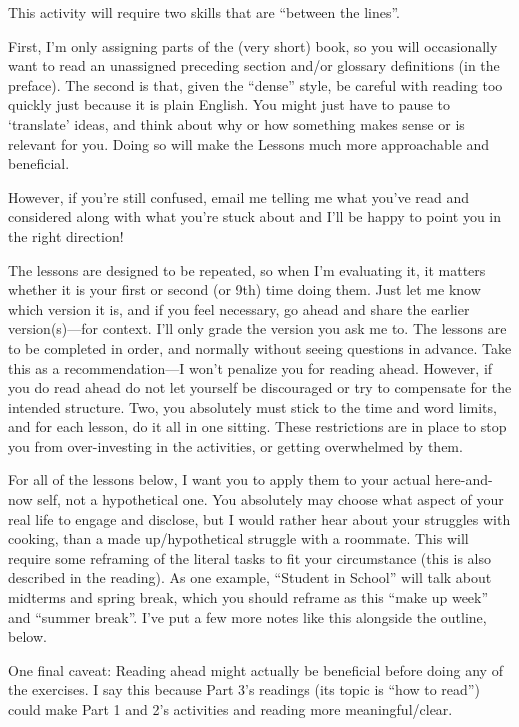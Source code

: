 \documentclass[
]{book}
\begin{document}
This activity will require two skills that are ``between the lines''.

First, I'm only assigning parts of the (very short) book, so you will occasionally want to read an unassigned preceding section and/or glossary definitions (in the preface). The second is that, given the ``dense'' style, be careful with reading too quickly just because it is plain English. You might just have to pause to `translate' ideas, and think about why or how something makes sense or is relevant for you. Doing so will make the Lessons much more approachable and beneficial.

However, if you're still confused, email me telling me what you've read and considered along with what you're stuck about and I'll be happy to point you in the right direction!

The lessons are designed to be repeated, so when I'm evaluating it, it matters whether it is your first or second (or 9th) time doing them. Just let me know which version it is, and if you feel necessary, go ahead and share the earlier version(s)---for context. I'll only grade the version you ask me to.
The lessons are to be completed in order, and normally without seeing questions in advance. Take this as a recommendation---I won't penalize you for reading ahead. However, if you do read ahead do not let yourself be discouraged or try to compensate for the intended structure. Two, you absolutely must stick to the time and word limits, and for each lesson, do it all in one sitting. These restrictions are in place to stop you from over-investing in the activities, or getting overwhelmed by them.

For all of the lessons below, I want you to apply them to your actual here-and-now self, not a hypothetical one. You absolutely may choose what aspect of your real life to engage and disclose, but I would rather hear about your struggles with cooking, than a made up/hypothetical struggle with a roommate. This will require some reframing of the literal tasks to fit your circumstance (this is also described in the reading). As one example, ``Student in School'' will talk about midterms and spring break, which you should reframe as this ``make up week'' and ``summer break''. I've put a few more notes like this alongside the outline, below.

One final caveat: Reading ahead might actually be beneficial before doing any of the exercises. I say this because Part 3's readings (its topic is ``how to read'') could make Part 1 and 2's activities and reading more meaningful/clear.
\end{document}
